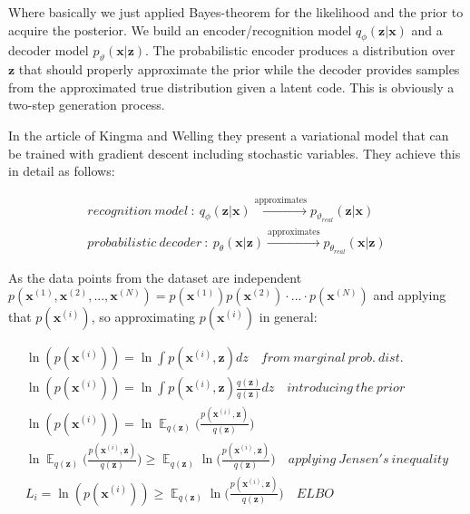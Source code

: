 \documentclass[11pt, english]{article}
\DeclareMathOperator*{\E}{\mathbb{E}}
\begin{document}
\par Where basically we just applied Bayes-theorem for the likelihood and the prior to acquire the posterior. We build an encoder/recognition model $q_{\phi}(\boldsymbol{\bm{z}} | \boldsymbol{\bm{x}})$ and a decoder model $p_{\vartheta}(\boldsymbol{\bm{x}} | \boldsymbol{\bm{z}})$. The probabilistic encoder produces a distribution over $\boldsymbol{\bm{z}}$ that should properly approximate the prior while the  decoder provides samples from the approximated true distribution given a latent code. This is obviously a two-step generation process. 

\vspace{3mm}

\par In the article of Kingma and Welling \cite{kingma2013auto} they present a variational model that can be trained with gradient descent including stochastic variables. They achieve this in detail as follows:

\vspace{3mm}

\begin{gather*}
    recognition\ model\ :\  q_{\phi}(\bm{z}|\bm{x}) \xrightarrow{\text{approximates}} p_{\vartheta_{real}}(\bm{z} | \bm{x}) \\
    probabilistic\ decoder\ :\ p_{\theta}(\bm{x} | \bm{z}) \xrightarrow{\text{approximates}} p_{\theta_{real}}(\bm{x} | \bm{z})
\end{gather*}

\vspace{3mm}

\par As the data points from the dataset are independent $p(\bm{x}^{(1)}, \bm{x}^{(2)}, ..., \bm{x}^{(N)}) = p(\bm{x}^{(1)})p(\bm{x}^{(2)})\cdot ... \cdot p(\bm{x}^{(N)})$ and applying that $p(\bm{x}^{(i)})$, so approximating $p(\bm{x}^{(i)})$ in general:

\vspace{3mm}

\begin{gather}
    \ln(p(\bm{x}^{(i)})) = \ln\int p(\bm{x}^{(i)}, \bm{z})dz \quad from\ marginal\ prob.\ dist.\\
    \ln(p(\bm{x}^{(i)})) = \ln\int p(\bm{x}^{(i)}, \bm{z})\frac{q(\bm{z})}{q(\bm{z})}dz \quad introducing\ the\ prior \\
    \ln(p(\bm{x}^{(i)})) = \ln \E_{q(\bm{z})} \Big( \frac{p(\bm{x}^{(i)}, \bm{z})}{q(\bm{z})}\Big) \\
    \ln \E_{q(\bm{z})} \Big( \frac{p(\bm{x}^{(i)}, \bm{z})}{q(\bm{z})}\Big) \geq \E_{q(\bm{z})} \ln\Big( \frac{p(\bm{x}^{(i)}, \bm{z})}{q(\bm{z})}\Big) \quad applying\ Jensen's\ inequality \\
    L_{i} = \ln(p(\bm{x}^{(i)})) \geq \E_{q(\bm{z})} \ln\Big( \frac{p(\bm{x}^{(i)}, \bm{z})}{q(\bm{z})}\Big) \quad ELBO
\end{gather}
\end{document}
